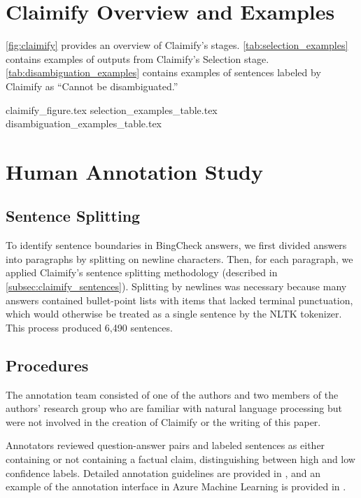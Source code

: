 \pagebreak
\section{Claimify Overview and Examples}
\label{app:claimify}

\autoref{fig:claimify} provides an overview of Claimify’s stages. \autoref{tab:selection_examples} contains examples of outputs from Claimify’s Selection stage. \autoref{tab:disambiguation_examples} contains examples of sentences labeled by Claimify as ``Cannot be disambiguated.'' 

{claimify_figure.tex}
{selection_examples_table.tex}
{disambiguation_examples_table.tex}

\section{Human Annotation Study}
\label{app:annotation}

\subsection{Sentence Splitting}
\label{app:ann_sentences}

To identify sentence boundaries in BingCheck answers, we first divided answers into paragraphs by splitting on newline characters. Then, for each paragraph, we applied Claimify’s sentence splitting methodology (described in \autoref{subsec:claimify_sentences}). Splitting by newlines was necessary because many answers contained bullet-point lists with items that lacked terminal punctuation, which would otherwise be treated as a single sentence by the NLTK tokenizer. This process produced 6,490 sentences. 

\subsection{Procedures}
The annotation team consisted of one of the authors and two members of the authors’ research group who are familiar with natural language processing but were not involved in the creation of Claimify or the writing of this paper.

Annotators reviewed question-answer pairs and labeled sentences as either containing or not containing a factual claim, distinguishing between high and low confidence labels. Detailed annotation guidelines are provided in , and an example of the annotation interface in Azure Machine Learning is provided in .

